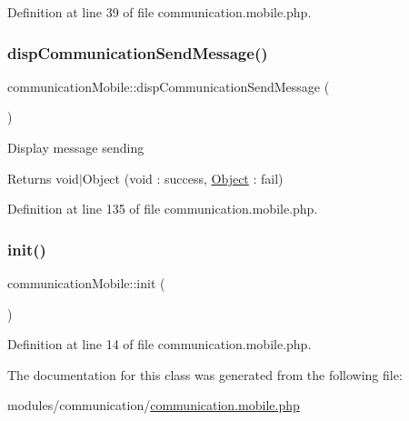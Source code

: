 Definition at line 39 of file communication.\+mobile.\+php.

\hypertarget{classcommunicationMobile_adb243fe0a373f12d98d472a895e41d7a}{}\label{classcommunicationMobile_adb243fe0a373f12d98d472a895e41d7a} 
\subsubsection{\texorpdfstring{disp\+Communication\+Send\+Message()}{dispCommunicationSendMessage()}}
{\footnotesize\ttfamily communication\+Mobile\+::disp\+Communication\+Send\+Message (\begin{DoxyParamCaption}{ }\end{DoxyParamCaption})}

Display message sending \begin{DoxyReturn}{Returns}
void$\vert$\+Object (void \+: success, \hyperlink{classObject}{Object} \+: fail) 
\end{DoxyReturn}


Definition at line 135 of file communication.\+mobile.\+php.

\hypertarget{classcommunicationMobile_a3fc9dd0a130e004c1fb5895ac6d4c920}{}\label{classcommunicationMobile_a3fc9dd0a130e004c1fb5895ac6d4c920} 
\subsubsection{\texorpdfstring{init()}{init()}}
{\footnotesize\ttfamily communication\+Mobile\+::init (\begin{DoxyParamCaption}{ }\end{DoxyParamCaption})}



Definition at line 14 of file communication.\+mobile.\+php.



The documentation for this class was generated from the following file\+:\begin{DoxyCompactItemize}
\item 
modules/communication/\hyperlink{communication_8mobile_8php}{communication.\+mobile.\+php}\end{DoxyCompactItemize}
